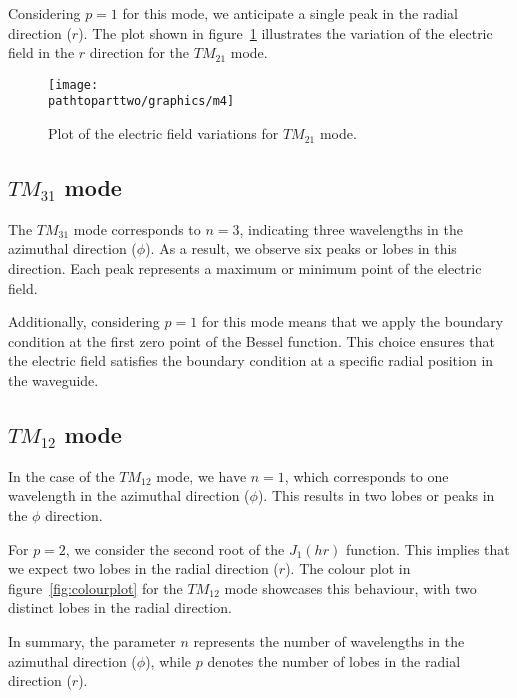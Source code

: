 Considering $p=1$ for this mode, we anticipate a single peak in the radial direction ($r$). The plot shown in figure~\ref{fig:m4} illustrates the variation of the electric field in the $r$ direction for the $TM_{21}$ mode.
\begin{figure}[h]
\centering
\texttt{[image: \\pathtoparttwo/graphics/m4]}
\caption{Plot of the electric field variations for $TM_{21}$ mode.}
\label{fig:m4}
\end{figure}

\subsection{$TM_{31}$ mode}
The $TM_{31}$ mode corresponds to $n=3$, indicating three wavelengths in the azimuthal direction ($\phi$). As a result, we observe six peaks or lobes in this direction. Each peak represents a maximum or minimum point of the electric field.

Additionally, considering $p=1$ for this mode means that we apply the boundary condition at the first zero point of the Bessel function. This choice ensures that the electric field satisfies the boundary condition at a specific radial position in the waveguide.

\subsection{$TM_{12}$ mode}
In the case of the $TM_{12}$ mode, we have $n=1$, which corresponds to one wavelength in the azimuthal direction ($\phi$). This results in two lobes or peaks in the $\phi$ direction.

For $p=2$, we consider the second root of the $J_1(hr)$ function. This implies that we expect two lobes in the radial direction ($r$). The colour plot in figure~\ref{fig:colourplot} for the $TM_{12}$ mode showcases this behaviour, with two distinct lobes in the radial direction.

In summary, the parameter $n$ represents the number of wavelengths in the azimuthal direction ($\phi$), while $p$ denotes the number of lobes in the radial direction ($r$).
   
